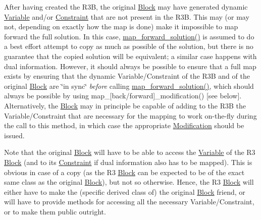 \begin{DoxyItemize}
\item After having created the R3B, the original \mbox{\hyperlink{class_s_m_spp__di__unipi__it_1_1_block}{Block}} may have generated dynamic \mbox{\hyperlink{class_s_m_spp__di__unipi__it_1_1_variable}{Variable}} and/or \mbox{\hyperlink{class_s_m_spp__di__unipi__it_1_1_constraint}{Constraint}} that are not present in the R3B. This may (or may not, depending on exactly how the map is done) make it impossible to map forward the full solution. In this case, \mbox{\hyperlink{class_s_m_spp__di__unipi__it_1_1_block_a7759467d70613a10c1cdb5d3193b4434}{map\+\_\+forward\+\_\+solution()}} is assumed to do a best effort attempt to copy as much as possible of the solution, but there is no guarantee that the copied solution will be equivalent; a similar case happens with dual information. However, it should always be possible to ensure that a full map exists by ensuring that the dynamic Variable/\+Constraint of the R3B and of the original \mbox{\hyperlink{class_s_m_spp__di__unipi__it_1_1_block}{Block}} are \char`\"{}in sync\char`\"{} {\itshape before} calling \mbox{\hyperlink{class_s_m_spp__di__unipi__it_1_1_block_a7759467d70613a10c1cdb5d3193b4434}{map\+\_\+forward\+\_\+solution()}}, which should always be possible by using map\+\_\+\mbox{[}back/forward\mbox{]}\+\_\+modification() \mbox{[}see below\mbox{]}. Alternatively, the \mbox{\hyperlink{class_s_m_spp__di__unipi__it_1_1_block}{Block}} may in principle be capable of adding to the R3B the Variable/\+Constraint that are necessary for the mapping to work on-\/the-\/fly during the call to this method, in which case the appropriate \mbox{\hyperlink{class_s_m_spp__di__unipi__it_1_1_modification}{Modification}} should be issued.
\end{DoxyItemize}

Note that the original \mbox{\hyperlink{class_s_m_spp__di__unipi__it_1_1_block}{Block}} will have to be able to access the \mbox{\hyperlink{class_s_m_spp__di__unipi__it_1_1_variable}{Variable}} of the R3 \mbox{\hyperlink{class_s_m_spp__di__unipi__it_1_1_block}{Block}} (and to its \mbox{\hyperlink{class_s_m_spp__di__unipi__it_1_1_constraint}{Constraint}} if dual information also has to be mapped). This is obvious in case of a copy (as the R3 \mbox{\hyperlink{class_s_m_spp__di__unipi__it_1_1_block}{Block}} can be expected to be of the exact same class as the original \mbox{\hyperlink{class_s_m_spp__di__unipi__it_1_1_block}{Block}}), but not so otherwise. Hence, the R3 \mbox{\hyperlink{class_s_m_spp__di__unipi__it_1_1_block}{Block}} will either have to make the (specific derived class of) the original \mbox{\hyperlink{class_s_m_spp__di__unipi__it_1_1_block}{Block}} friend, or will have to provide methods for accessing all the necessary Variable/\+Constraint, or to make them public outright.

